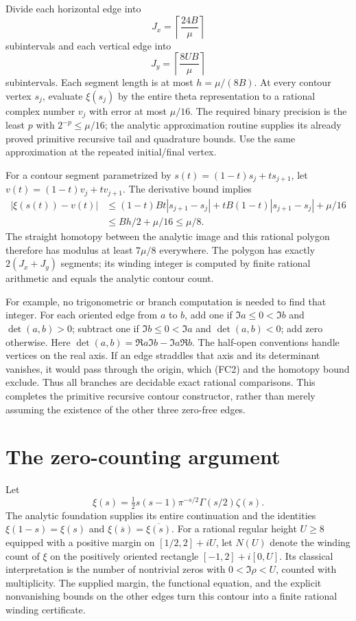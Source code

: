 Divide each horizontal edge into
\[
 J_x=\left\lceil\frac{24B}{\mu}\right\rceil
\]
subintervals and each vertical edge into
\[
 J_y=\left\lceil\frac{8UB}{\mu}\right\rceil
\]
subintervals.  Each segment length is at most $h=\mu/(8B)$.
At every contour vertex $s_j$, evaluate $\xi(s_j)$ by the entire theta
representation to a rational complex number $v_j$ with error at most
$\mu/16$.  The required binary precision is the least $p$ with
$2^{-p}\le\mu/16$; the analytic approximation routine supplies its already
proved primitive recursive tail and quadrature bounds.  Use the same
approximation at the repeated initial/final vertex.

For a contour segment parametrized by
$s(t)=(1-t)s_j+ts_{j+1}$, let
$v(t)=(1-t)v_j+tv_{j+1}$.
The derivative bound implies
\[
 \begin{aligned}
 |\xi(s(t))-v(t)|
 &\le (1-t)Bt|s_{j+1}-s_j|
       +tB(1-t)|s_{j+1}-s_j|+\mu/16\\
 &\le Bh/2+\mu/16\le\mu/8.
 \end{aligned}
\]
The straight homotopy between the analytic image and this rational polygon
therefore has modulus at least $7\mu/8$ everywhere.
The polygon has exactly $2(J_x+J_y)$ segments; its winding integer is
computed by finite rational arithmetic and equals the analytic contour
count.

For example, no trigonometric or branch computation is needed to find that
integer.  For each oriented edge from $a$ to $b$, add one if
$\Im a\le0<\Im b$ and $\det(a,b)>0$; subtract one if
$\Im b\le0<\Im a$ and $\det(a,b)<0$; add zero otherwise.
Here $\det(a,b)=\Re a\Im b-\Im a\Re b$.
The half-open conventions handle vertices on the real axis.
If an edge straddles that axis and its determinant vanishes, it would pass
through the origin, which (FC2) and the homotopy bound exclude.
Thus all branches are decidable exact rational comparisons.
This completes the primitive recursive contour constructor, rather than
merely assuming the existence of the other three zero-free edges.

\section{The zero-counting argument}
\label{sec:counting}

Let
\[
 \xi(s)=\tfrac12s(s-1)\pi^{-s/2}\Gamma(s/2)\zeta(s).
\]
The analytic foundation supplies its entire continuation and the identities
$\xi(1-s)=\xi(s)$ and $\xi(\overline s)=\overline{\xi(s)}$.
For a rational regular height $U\ge8$ equipped with a positive margin on
$[1/2,2]+iU$, let $N(U)$ denote the winding count of $\xi$ on the
positively oriented rectangle $[-1,2]+i[0,U]$.  Its classical interpretation
is the number of nontrivial zeros with $0<\Im\rho<U$, counted with
multiplicity.  The supplied margin, the functional equation, and the
explicit nonvanishing bounds on the other edges turn this contour into a
finite rational winding certificate.

